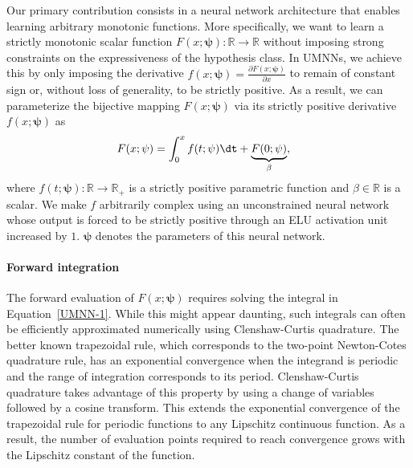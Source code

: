 Our primary contribution consists in a neural network architecture that enables learning arbitrary monotonic functions.
More specifically, we want to learn a strictly monotonic scalar function $F(x; \mathbf{\psi}): \mathbb{R}\rightarrow\mathbb{R}$ without imposing strong constraints on the expressiveness of the hypothesis class.
In UMNNs, we achieve this by only imposing the derivative $f(x; \mathbf{\psi}) = \tfrac{\partial F(x; \mathbf{\psi})}{\partial x}$ to remain of constant sign or, without loss of generality, to be strictly positive.
As a result, we can parameterize the bijective mapping $F(x; \mathbf{\psi})$ via its strictly positive derivative $f(x; \mathbf{\psi})$ as
\begin{align}
    F(x; \mathbf{\psi}) &= \int^x_0 f(t; \mathbf{\psi}) \dt + \underbrace{F(0; \mathbf{\psi})}_{\beta},\label{UMNN-1}%
\end{align}
where $f(t; \mathbf{\psi}): \mathbb{R}\rightarrow\mathbb{R}_+$ is a strictly positive parametric function and $\beta \in \mathbb{R}$ is a scalar. We make $f$ arbitrarily complex using an unconstrained neural network whose output is forced to be strictly positive through an ELU activation unit increased by $1$. $\mathbf{\psi}$ denotes the parameters of this neural network.

\paragraph{Forward integration}
The forward evaluation of $F(x; \mathbf{\psi})$ requires solving the integral in Equation~\eqref{UMNN-1}. While this might appear daunting, such integrals can often be efficiently approximated numerically using Clenshaw-Curtis quadrature.
The better known trapezoidal rule, which corresponds to the two-point Newton-Cotes quadrature rule, has an exponential convergence when the integrand is periodic and the range of integration corresponds to its period. Clenshaw-Curtis quadrature takes advantage of this property by using a change of variables followed by a cosine transform. This extends the exponential convergence of the trapezoidal rule for periodic functions to any Lipschitz continuous function.
As a result, the number of evaluation points required to reach convergence grows with the Lipschitz constant of the function.

